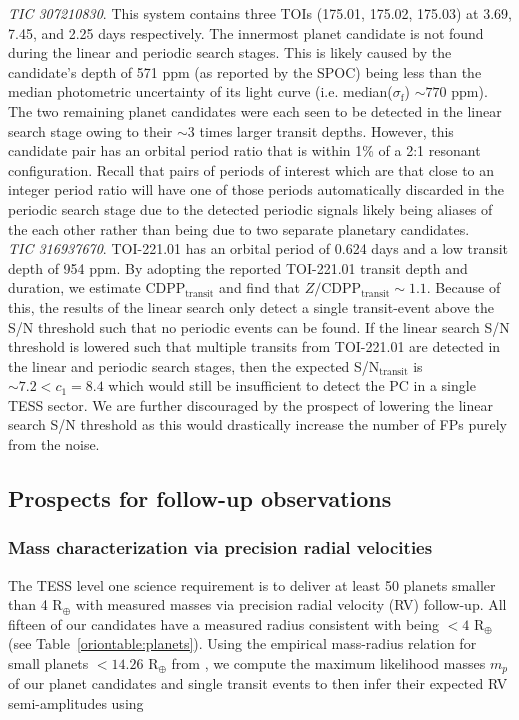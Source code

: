 \emph{TIC 307210830}. This system contains three TOIs (175.01, 175.02, 175.03) at 3.69, 7.45,
and 2.25 days respectively. The innermost planet candidate is not found during the linear and
periodic search stages. This is likely caused by the candidate's depth of 571 ppm
(as reported by the SPOC) being less than the median photometric uncertainty of
its light curve (i.e. median($\sigma_{\text{f}}$) $\sim 770$ ppm). The two remaining planet candidates were each seen
to be detected in the \pipeline{} linear search stage owing to their $\sim 3$ times larger
transit depths. However, this candidate pair has an orbital period ratio that is within 1\%
of a 2:1 resonant configuration. Recall that pairs of periods of interest which are that close to
an integer period ratio will have one of those periods automatically discarded in the periodic search
stage due to the detected periodic signals likely being aliases of the each other rather than being
due to two separate planetary candidates. \\


\emph{TIC 316937670}. TOI-221.01 has an orbital period of 0.624 days and a low transit depth
of 954 ppm. By adopting the reported TOI-221.01 transit depth and duration, we estimate
CDPP$_{\text{transit}}$ and find that $Z/\text{CDPP}_{\text{transit}} \sim 1.1$. Because of this,
the results of the \pipeline{} linear search only detect
a single transit-event above the S/N threshold such that
no periodic events can be found. If the linear search S/N threshold is lowered
such that multiple transits from TOI-221.01 are detected in the linear and periodic search stages, then
the expected S/N$_{\text{transit}}$ is $\sim 7.2 < c_1 = 8.4$ which would still be insufficient to detect the PC in
a single TESS sector. We are further discouraged by the prospect of lowering the linear search S/N
threshold as this would drastically increase the number of FPs purely from the noise. \\

\subsection{Prospects for follow-up observations}
\subsubsection{Mass characterization via precision radial velocities} \label{sect:rv}
The TESS level one science requirement is to deliver at least 50 planets smaller than 4
R$_{\oplus}$ with measured masses via precision radial velocity (RV) follow-up. All fifteen of our
candidates have a measured radius consistent with being $<4$ R$_{\oplus}$ (see Table~\ref{oriontable:planets}).
Using the empirical mass-radius relation for small planets $<14.26$ R$_{\oplus}$ from \cite{chen17},
we compute the maximum likelihood masses $m_p$ of our planet candidates and single transit events
to then infer their expected RV semi-amplitudes using 

